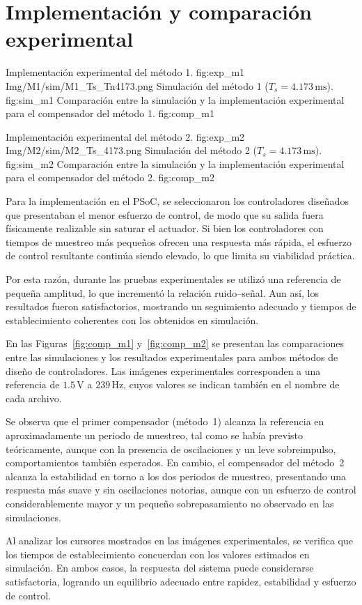 
\twocolumn
\section{Implementación y comparación experimental}


{Implementación experimental del método 1.}
{fig:exp_m1}
{Img/M1/sim/M1_Ts_Tn4173.png}
{Simulación del método 1 ($T_s = 4.173\,\text{ms}$).}
{fig:sim_m1}
{Comparación entre la simulación y la implementación experimental para el compensador del método 1.}
{fig:comp_m1}

{Implementación experimental del método 2.}
{fig:exp_m2}
{Img/M2/sim/M2_Ts_4173.png}
{Simulación del método 2 ($T_s = 4.173\,\text{ms}$).}
{fig:sim_m2}
{Comparación entre la simulación y la implementación experimental para el compensador del método 2.}
{fig:comp_m2}



Para la implementación en el PSoC, se seleccionaron los controladores diseñados que presentaban el menor esfuerzo de control, de modo que su salida fuera físicamente realizable sin saturar el actuador.  
Si bien los controladores con tiempos de muestreo más pequeños ofrecen una respuesta más rápida, el esfuerzo de control resultante continúa siendo elevado, lo que limita su viabilidad práctica.

Por esta razón, durante las pruebas experimentales se utilizó una referencia de pequeña amplitud, lo que incrementó la relación ruido–señal. Aun así, los resultados fueron satisfactorios, mostrando un seguimiento adecuado y tiempos de establecimiento coherentes con los obtenidos en simulación.

En las Figuras~\ref{fig:comp_m1} y~\ref{fig:comp_m2} se presentan las comparaciones entre las simulaciones y los resultados experimentales para ambos métodos de diseño de controladores.  
Las imágenes experimentales corresponden a una referencia de \(1.5\,\text{V}\) a \(239\,\text{Hz}\), cuyos valores se indican también en el nombre de cada archivo.




Se observa que el primer compensador (método~1) alcanza la referencia en aproximadamente un periodo de muestreo, tal como se había previsto teóricamente, aunque con la presencia de oscilaciones y un leve sobreimpulso, comportamientos también esperados.  
En cambio, el compensador del método~2 alcanza la estabilidad en torno a los dos periodos de muestreo, presentando una respuesta más suave y sin oscilaciones notorias, aunque con un esfuerzo de control considerablemente mayor y un pequeño sobrepasamiento no observado en las simulaciones.

Al analizar los cursores mostrados en las imágenes experimentales, se verifica que los tiempos de establecimiento concuerdan con los valores estimados en simulación. En ambos casos, la respuesta del sistema puede considerarse satisfactoria, logrando un equilibrio adecuado entre rapidez, estabilidad y esfuerzo de control.


